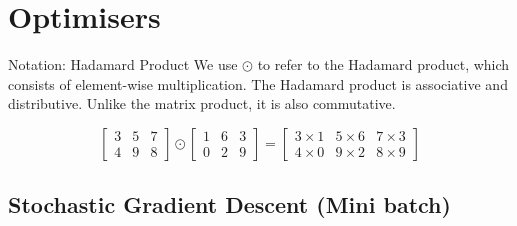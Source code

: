 \section{Optimisers}
\begin{commentbox}{Notation: Hadamard Product}
    We use \(\odot\) to refer to the Hadamard product, which consists of element-wise multiplication. The Hadamard product is associative and distributive. Unlike the matrix product, it is also commutative.

    \[
\begin{bmatrix}3&5&7\\4&9&8\end{bmatrix}\odot\begin{bmatrix}1&6&3\\0&2&9\end{bmatrix}=\begin{bmatrix}3\times1&5\times6&7\times3\\4\times0&9\times2&8\times9\end{bmatrix}
    \]
    
\end{commentbox}
\subsection{Stochastic Gradient Descent (Mini batch)}

